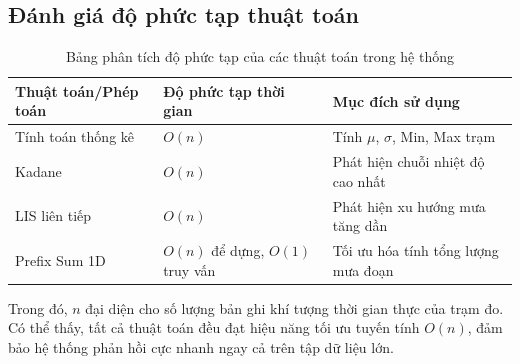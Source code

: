 \subsection{Đánh giá độ phức tạp thuật toán}
\begin{table}[H]
    \centering
    \caption{Bảng phân tích độ phức tạp của các thuật toán trong hệ thống}
    \begin{tabularx}{\textwidth}{|l|X|X|}
        \hline
        \textbf{Thuật toán/Phép toán} & \textbf{Độ phức tạp thời gian} & \textbf{Mục đích sử dụng} \\ \hline
        Tính toán thống kê & $O(n)$ & Tính $\mu$, $\sigma$, Min, Max trạm \\ \hline
        Kadane & $O(n)$ & Phát hiện chuỗi nhiệt độ cao nhất \\ \hline
        LIS liên tiếp & $O(n)$ & Phát hiện xu hướng mưa tăng dần \\ \hline
        Prefix Sum 1D & $O(n)$ để dựng, $O(1)$ truy vấn & Tối ưu hóa tính tổng lượng mưa đoạn \\ \hline
    \end{tabularx}
    \label{tab:complexity}
\end{table}
Trong đó, $n$ đại diện cho số lượng bản ghi khí tượng thời gian thực của trạm đo. Có thể thấy, tất cả thuật toán đều đạt hiệu năng tối ưu tuyến tính $O(n)$, đảm bảo hệ thống phản hồi cực nhanh ngay cả trên tập dữ liệu lớn.
